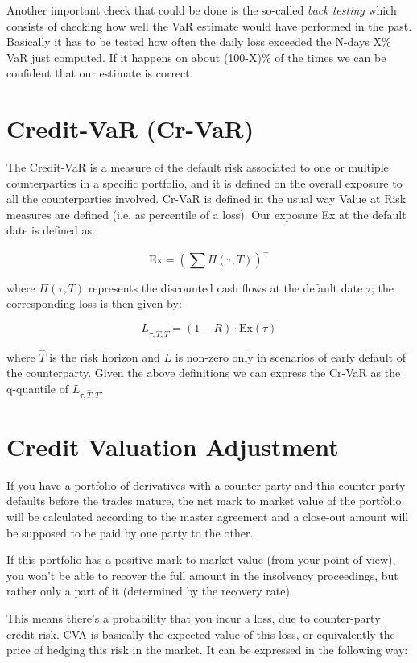 Another important check that could be done is the so-called \emph{back testing}
which consists of checking how well the VaR estimate would have
performed in the past. Basically it has to be tested how often the daily
loss exceeded the N-days X\% VaR just computed. If it happens on about
(100-X)\% of the times we can be confident that our estimate is correct.

\section{Credit-VaR (Cr-VaR)}\label{credit-var-cr-var}

The Credit-VaR is a measure of the default risk associated to one or
multiple counterparties in a specific portfolio, and it is defined on
the overall exposure to all the counterparties involved. Cr-VaR is
defined in the usual way Value at Risk measures are defined (i.e. as
percentile of a loss). Our exposure Ex at the default date is defined
as:

\[ \textrm{Ex} = (\sum \Pi(\tau, T))^{+}\]

where \(\Pi(\tau,T)\) represents the discounted cash flows at the
default date \(\tau\); the corresponding loss is then given by:

\[L_{\tau, \hat{T}, T} = (1 - R) \cdot \textrm{Ex}(\tau)\]

where \(\hat{T}\) is the risk horizon and \(L\) is non-zero only in
scenarios of early default of the counterparty. Given the above
definitions we can express the Cr-VaR as the q-quantile of
\(L_{\tau, \hat{T}, T}\).

\section{Credit Valuation
Adjustment}\label{credit-valuation-adjustment}

If you have a portfolio of derivatives with a counter-party and this
counter-party defaults before the trades mature, the net mark to market
value of the portfolio will be calculated according to the master
agreement and a close-out amount will be supposed to be paid by one
party to the other.

If this portfolio has a positive mark to market value (from your point
of view), you won't be able to recover the full amount in the insolvency
proceedings, but rather only a part of it (determined by the recovery
rate).

This means there's a probability that you incur a loss, due to
counter-party credit risk. CVA is basically the expected value of this
loss, or equivalently the price of hedging this risk in the market. It
can be expressed in the following way:

